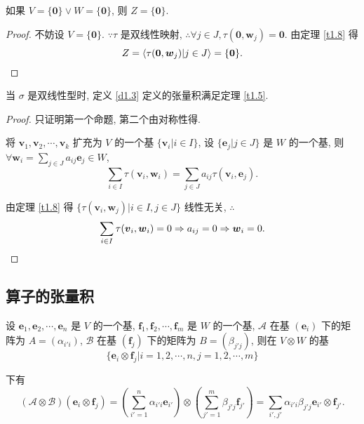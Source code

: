 \documentclass[color=black,device=normal,lang=cn,mode=geye]{elegantnote}
\begin{document}
\begin{corollary}
    如果 $V=\{\boldsymbol{0}\}\vee W=\{\boldsymbol{0}\}$, 则 $Z=\{\boldsymbol{0}\}$.
\end{corollary}
\begin{proof}
    不妨设 $V=\{\boldsymbol{0}\}$. $\because\tau$ 是双线性映射, $\therefore\forall j\in J,\tau(\boldsymbol{0},\boldsymbol{w}_j)=\boldsymbol{0}$. 由定理 \ref{t1.8} 得
    \[Z=\left<\tau(\boldsymbol{0},\boldsymbol{w}_j)|j\in J\right>=\{\boldsymbol{0}\}.\qedhere\]
\end{proof}
\begin{corollary}
    当 $\sigma$ 是双线性型时, 定义 \ref{d1.3} 定义的张量积满足定理 \ref{t1.5}.
\end{corollary}
\begin{proof}
    只证明第一个命题, 第二个由对称性得.

    将 $\boldsymbol{v}_1,\boldsymbol{v}_2,\cdots,\boldsymbol{v}_k$ 扩充为 $V$ 的一个基 $\{\boldsymbol{v}_i|i\in I\}$, 设 $\{\boldsymbol{e}_j|j\in J\}$ 是 $W$ 的一个基, 则 $\forall\boldsymbol{w}_i=\sum\limits_{j\in J}a_{ij}\boldsymbol{e}_j\in W$,
    \[\sum\limits_{i\in I}\tau(\boldsymbol{v}_i,\boldsymbol{w}_i)=\sum\limits_{j\in J}a_{ij}\tau(\boldsymbol{v}_i,\boldsymbol{e}_j).\]

    由定理 \ref{t1.8} 得 $\{\tau(\boldsymbol{v}_i,\boldsymbol{w}_j)|i\in I,j\in J\}$ 线性无关, $\therefore$
    \[\sum\limits_{i\in I}\tau(\boldsymbol{v}_i,\boldsymbol{w}_i)=0\Rightarrow a_{ij}=0\Rightarrow \boldsymbol{w}_i=0.\qedhere\]
\end{proof}
 \subsection{算子的张量积}
设 $\boldsymbol{e}_1,\boldsymbol{e}_2,\cdots,\boldsymbol{e}_n$ 是 $V$ 的一个基, $\boldsymbol{f}_1,\boldsymbol{f}_2,\cdots,\boldsymbol{f}_m$ 是 $W$ 的一个基, $\mathcal{A}$ 在基 $(\boldsymbol{e}_i)$ 下的矩阵为 $A=(\alpha_{i'i})$, $\mathcal{B}$ 在基 $(\boldsymbol{f}_j)$ 下的矩阵为 $B=(\beta_{j'j})$, 则在 $V\otimes W$ 的基
\begin{equation}\label{eq1.3}
    \{\boldsymbol{e}_i\otimes\boldsymbol{f}_j|i=1,2,\cdots,n,j=1,2,\cdots,m\}
\end{equation}

下有
\[(\mathcal{A}\otimes\mathcal{B})(\boldsymbol{e}_i\otimes\boldsymbol{f}_j)=\left(\sum\limits_{i'=1}^n\alpha_{i'i}\boldsymbol{e}_{i'}\right)\otimes\left(\sum\limits_{j'=1}^m\beta_{j'j}\boldsymbol{f}_{j'}\right)=\sum\limits_{i',j'}\alpha_{i'i}\beta_{j'j}\boldsymbol{e}_{i'}\otimes\boldsymbol{f}_{j'}.\]
\end{document}
